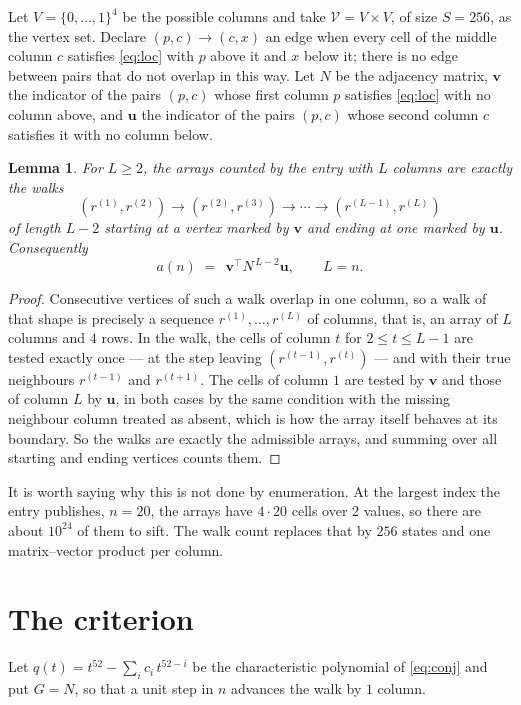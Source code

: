 \documentclass[11pt,a4paper]{article}
\theoremstyle{plain}
\newtheorem{lemma}[theorem]{Lemma}
\theoremstyle{definition}
\begin{document}
Let $V=\{0,\dots,1\}^{4}$ be the possible columns and take
$\mathcal V=V\times V$, of size $S=256$, as the vertex set. Declare $(p,c)\to(c,x)$ an edge
when every cell of the middle column $c$ satisfies \eqref{eq:loc} with $p$ above it and $x$
below it; there is no edge between pairs that do not overlap in this way. Let $N$ be the
adjacency matrix, $\mathbf{v}$ the indicator of the pairs $(p,c)$ whose first column $p$
satisfies \eqref{eq:loc} with no column above, and $\mathbf{u}$ the indicator of
the pairs $(p,c)$ whose second column $c$ satisfies it with no column below.

\begin{lemma}\label{lem:walk}
For $L\ge2$, the arrays counted by the entry with $L$ columns are exactly the walks
\[
(r^{(1)},r^{(2)})\to(r^{(2)},r^{(3)})\to\cdots\to(r^{(L-1)},r^{(L)})
\]
of length $L-2$ starting at a vertex marked by $\mathbf{v}$ and ending at one marked by
$\mathbf{u}$. Consequently
\[
a(n)\;=\;\,\mathbf{v}^{\!\top}N^{\,L-2}\mathbf{u},\qquad L=n .
\]
\end{lemma}

\begin{proof}
Consecutive vertices of such a walk overlap in one column, so a walk of that shape is
precisely a sequence $r^{(1)},\dots,r^{(L)}$ of columns, that is, an array of $L$ columns
and $4$ rows. In the walk, the cells of column $t$ for $2\le t\le L-1$ are tested
exactly once --- at the step leaving $(r^{(t-1)},r^{(t)})$ --- and with their true
neighbours $r^{(t-1)}$ and $r^{(t+1)}$. The cells of column $1$ are tested by
$\mathbf{v}$ and those of column $L$ by $\mathbf{u}$, in both cases by the same condition
with the missing neighbour column treated as absent, which is how the array itself behaves at
its boundary. So the walks are exactly the admissible arrays, and summing over all starting
and ending vertices counts them.
\end{proof}


It is worth saying why this is not done by enumeration. At the largest index the entry
publishes, $n=20$, the arrays have $4\cdot20$ cells over
$2$ values, so there are about $10^{24}$ of them to sift. The
walk count replaces that by $256$ states and one matrix--vector product per column.
\section{The criterion}

Let $q(t)=t^{52}-\sum_i c_i\,t^{52-i}$ be the characteristic polynomial of
\eqref{eq:conj} and put $G=N$, so that a unit step in $n$ advances the walk by
$1$ column.
\end{document}
